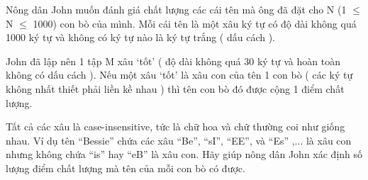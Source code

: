 Nông dân John muốn đánh giá chất lượng các cái tên mà ông đã đặt  cho N (1  $\le$  N  $\le$  1000) con bò của mình. Mỗi cái tên là một xâu ký tự  có độ dài không quá 1000 ký tự và không có ký tự nào là ký tự trắng ( dấu cách ).  

   John đã lập nên 1 tập M xâu ‘tốt’ ( độ dài không quá 30 ký tự và hoàn  toàn không có dấu cách ). Nếu một xâu ‘tốt’ là xâu con của tên 1 con  bò ( các ký tự không nhất thiết phải liền kề nhau ) thì tên con bò đó  được cộng 1 điểm chất lượng.  

   Tất cả các xâu là case-insensitive, tức là chữ hoa và chữ thường coi  như giống nhau. Ví dụ tên “Bessie” chứa các xâu “Be”, “sI”, “EE”,  và “Es” ,... là xâu con nhưng không chứa “is” hay “eB” là xâu  con. Hãy giúp nông dân John xác định số lượng điểm chất lượng mà  tên của mỗi con bò có được.